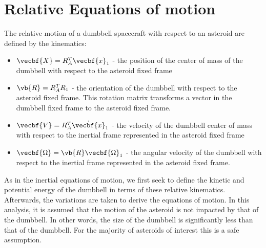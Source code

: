 \documentclass[11pt, reqno]{article}    %
\begin{document}
\section{Relative Equations of motion}\label{sec:relative_eoms}

The relative motion of a dumbbell spacecraft with respect to an asteroid are defined by the kinematics:
\begin{itemize}
    \item \( \vecbf{X} = R_A^T \vecbf{x}_1\) - the position of the center of mass of the dumbbell with respect to the asteroid fixed frame
    \item \( \vb{R} = R_A^T R_1\) - the orientation of the dumbbell with respect to the asteroid fixed frame. 
    This rotation matrix transforms a vector in the dumbbell fixed frame to the asteroid fixed frame.
    \item \( \vecbf{V} = R_A^T \dot{\vecbf{x}}_1 \) - the velocity of the dumbbell center of mass with respect to the inertial frame represented in the asteroid fixed frame
    \item \( \vecbf{\Omega} = \vb{R} \vecbf{\Omega}_1\) - the angular velocity of the dumbbell with respect to the inertial frame represented in the asteroid fixed frame.
\end{itemize}
As in the inertial equations of motion, we first seek to define the kinetic and potential energy of the dumbbell in terms of these relative kinematics. 
Afterwards, the variations are taken to derive the equations of motion.
In this analysis, it is assumed that the motion of the asteroid is not impacted by that of the dumbbell.
In other words, the size of the dumbbell is significantly less than that of the dumbbell. 
For the majority of asteroids of interest this is a safe assumption.
\end{document}
